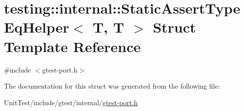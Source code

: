 \hypertarget{structtesting_1_1internal_1_1_static_assert_type_eq_helper_3_01_t_00_01_t_01_4}{\section{testing\+:\+:internal\+:\+:Static\+Assert\+Type\+Eq\+Helper$<$ T, T $>$ Struct Template Reference}
\label{structtesting_1_1internal_1_1_static_assert_type_eq_helper_3_01_t_00_01_t_01_4}
}


{\ttfamily \#include $<$gtest-\/port.\+h$>$}



The documentation for this struct was generated from the following file\+:\begin{DoxyCompactItemize}
\item 
Unit\+Test/include/gtest/internal/\hyperlink{gtest-port_8h}{gtest-\/port.\+h}\end{DoxyCompactItemize}
